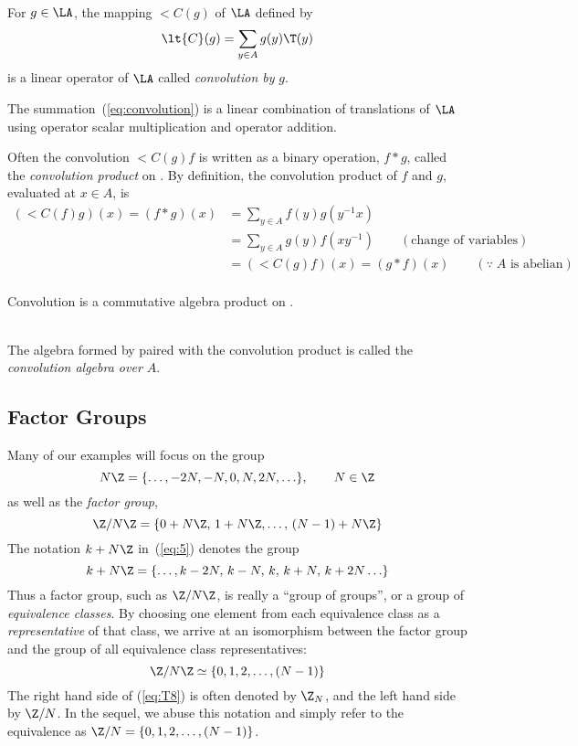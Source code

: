 \begin{definition}[Convolution]\\
For $g \in \LA$, the mapping $\lt{C}(g)$ of $\LA$ defined by 
\begin{equation}\label{eq:convolution}
\lt{C}(g) = \sum_{y\in A} g(y)\T(y)
\end{equation}
is a linear operator of $\LA$ called \emph{convolution by} $g$.  
\end{definition}
The summation~(\ref{eq:convolution}) is a linear combination of translations of
$\LA$ using operator scalar multiplication and operator addition. 

Often the convolution $\lt{C}(g)f$ is written as a binary operation, $f*g$, called
the \emph{convolution product} on \LA.  By definition, 
the convolution product of $f$ and $g$, evaluated at $x\in A$, is 
\begin{align*}
(\lt{C}(f)g)(x) = (f * g)(x) &= \sum_{y\in A} f(y)g(y^{-1}x)\\
&=\sum_{y\in A} g(y)f(xy^{-1})\qquad (\text{change of variables})\\
&=(\lt{C}(g)f)(x) = (g * f)(x)\qquad (\because \; A\text{ is abelian})\\
\end{align*}
\begin{theorem} Convolution is a commutative algebra product on \LA.
\end{theorem}
\begin{definition}\\
The algebra formed by \LA paired with the convolution product is called the
\emph{convolution algebra over $A$}.
\end{definition}

\subsection{Factor Groups}
Many of our examples will focus on the group
\[
N\Z = \{\ldots,-2N, -N,0,N,2N,\ldots\}, \qquad N \in \Z
\]
as well as the {\it factor group},
\begin{equation}\label{eq:5}
\Z/N\Z = \{0+N\Z, \, 1+N\Z, \ldots,\,(N-1)+N\Z \}
\end{equation}
The notation $k+N\Z$ in~(\ref{eq:5}) denotes the group
\[
k+N\Z = \{\ldots,k-2N,\, k-N,\, k,\, k+N,\, k+2N \ldots\}
\]
Thus a factor group, such as $\Z/N\Z$, is really a ``group of groups'', or
a group of {\it equivalence classes}. 
By choosing one element from each equivalence class as a {\it representative}
of that class, we arrive at an isomorphism between the factor group and the
group of all equivalence class representatives:
\begin{equation}\label{eq:T8}
\Z/N\Z \simeq \{0, 1, 2, \ldots, (N-1)\}
\end{equation}
The right hand side of (\ref{eq:T8}) is often denoted by $\Z_N$, and the left
hand side by $\Z/N$. In the sequel, we abuse this notation and simply refer
to the equivalence as $\Z/N = \{0, 1, 2, \ldots, (N-1)\}$.

